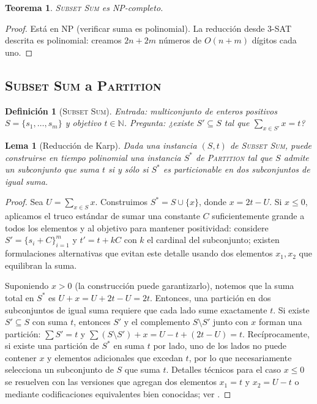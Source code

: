 \documentclass[11pt]{article}
\newtheorem{theorem}{Teorema}
\newtheorem{lemma}{Lema}
\newtheorem{definition}{Definición}
\begin{document}
\begin{theorem}
\textsc{Subset Sum} es NP-completo.
\end{theorem}
\begin{proof}
Está en NP (verificar suma es polinomial). La reducción desde \textsc{3-SAT} descrita es polinomial: creamos $2n + 2m$ números de $O(n+m)$ dígitos cada uno.
\end{proof}

\subsection{\textsc{Subset Sum} a \textsc{Partition}}
\begin{definition}[\textsc{Subset Sum}]
Entrada: multiconjunto de enteros positivos $S=\{s_1,\dots,s_m\}$ y objetivo $t\in\mathbb{N}$. Pregunta: ¿existe $S'\subseteq S$ tal que $\sum_{x\in S'} x = t$?
\end{definition}

\begin{lemma}[Reducción de Karp]
Dada una instancia $(S,t)$ de \textsc{Subset Sum}, puede construirse en tiempo polinomial una instancia $S^*$ de \textsc{Partition} tal que $S$ admite un subconjunto que suma $t$ si y sólo si $S^*$ es particionable en dos subconjuntos de igual suma.
\end{lemma}
\begin{proof}
Sea $U=\sum_{x\in S} x$. Construimos $S^* = S\cup\{x\}$, donde $x=2t-U$. Si $x\le 0$, aplicamos el truco estándar de sumar una constante $C$ suficientemente grande a todos los elementos y al objetivo para mantener positividad: considere $S' = \{s_i+C\}_{i=1}^m$ y $t' = t + kC$ con $k$ el cardinal del subconjunto; existen formulaciones alternativas que evitan este detalle usando dos elementos $x_1, x_2$ que equilibran la suma.

Suponiendo $x>0$ (la construcción puede garantizarlo), notemos que la suma total en $S^*$ es $U+x=U+2t-U=2t$. Entonces, una partición en dos subconjuntos de igual suma requiere que cada lado sume exactamente $t$. Si existe $S'\subseteq S$ con suma $t$, entonces $S'$ y el complemento $S\setminus S'$ junto con $x$ forman una partición: $\sum S' = t$ y $\sum(S\setminus S') + x = U - t + (2t - U) = t$. Recíprocamente, si existe una partición de $S^*$ en suma $t$ por lado, uno de los lados no puede contener $x$ y elementos adicionales que excedan $t$, por lo que necesariamente selecciona un subconjunto de $S$ que suma $t$. Detalles técnicos para el caso $x\le 0$ se resuelven con las versiones que agregan dos elementos $x_1=t$ y $x_2=U-t$ o mediante codificaciones equivalentes bien conocidas; ver \cite{gareyjohnson}.
\end{proof}
\end{document}
